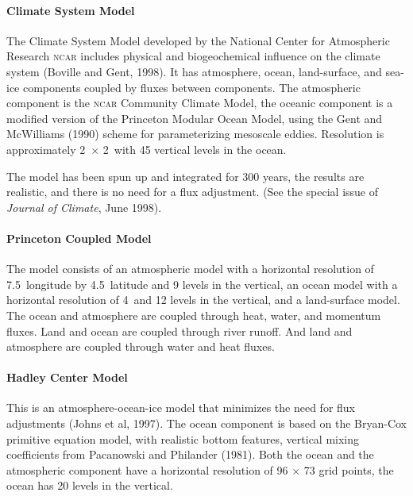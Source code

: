 \paragraph{Climate System Model} The Climate System Model developed by the National
Center for Atmospheric
Research \textsc{ncar} includes physical and biogeochemical influence on the climate
system (Boville and Gent, 1998). It has atmosphere, ocean, land-surface, and sea-ice
components coupled by fluxes between components. The atmospheric component is the
\textsc{ncar} Community Climate Model, the oceanic component is a modified version
of the Princeton Modular Ocean Model, using the Gent and McWilliams (1990) scheme
for parameterizing mesoscale eddies. Resolution is approximately
2\degrees\ $\times$ 2\degrees\ with 45 vertical levels in the ocean.

The model has been spun up and integrated for 300 years, the results are
realistic, and there is no need for a flux adjustment. (See the special issue of
\textit{Journal of Climate}, June 1998).

\paragraph{Princeton Coupled Model} The model consists of an atmospheric model with
a horizontal
resolution of 7.5\degrees\ longitude by 4.5\degrees\ latitude and 9 levels in the
vertical, an ocean model with a horizontal resolution of 4\degrees\ and 12 levels in
the vertical, and a land-surface model. The ocean and atmosphere are coupled through
heat, water, and momentum fluxes. Land and ocean are coupled through river runoff.
And land and atmosphere are coupled through water and heat fluxes.

\paragraph{Hadley Center Model} This is an atmosphere-ocean-ice model that minimizes the need for
flux adjustments (Johns et
al, 1997). The ocean component is based on the Bryan-Cox primitive equation model, with
realistic bottom features, vertical mixing coefficients from Pacanowski and Philander (1981). Both
the ocean and the atmospheric component have a horizontal resolution of 96
$\times$ 73 grid points, the ocean has 20 levels in the vertical.

